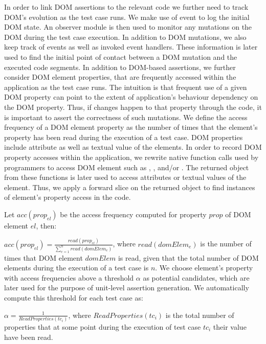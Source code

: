 In order to link DOM assertions to the relevant \javascript code we further need to track DOM's evolution as the test case runs. We make use of  event to log the initial DOM state. An observer module is then used to monitor any mutations on the DOM during the test case execution. In addition to DOM mutations, we also keep track of \javascript events as well as invoked event handlers. These information is later used to find the initial point of contact between a DOM mutation and the executed code segments. 
In addition to DOM-based assertions, we further consider DOM element properties, that are frequently accessed within the application as the test case runs. The intuition is that frequent use of a given DOM property can point to the extent of application's behaviour dependency on the DOM property. Thus, if changes happen to that property through the \javascript code, it is important to assert the correctness of such mutations. We define the access frequency of a DOM element property as the number of times that the element's property has been read during the execution of a test case. DOM properties include attribute as well as textual value of the elements.
In order to record DOM property accesses within the application, we rewrite native function calls used by programmers to access DOM element such as , , and/or . The returned object from these functions is later used to access attributes or textual values of the element. Thus, we apply a forward slice on the returned object to find instances of element's property access in the code.

Let $acc(prop_{el})$ be the access frequency computed for property $prop$ of DOM element $el$, then:
 
$acc(prop_{el})=\frac{read(prop_{el})}{\sum _{e=1}^{n} read(domElem_e)}$, where $read(domElem_{e})$ is the number of times that DOM element $domElem$ is read, given that the total number of DOM elements during the execution of a test case is $n$.
We choose element's property with access frequencies above a threshold $\alpha$ as potential candidates, which are later used for the purpose of unit-level assertion generation. We automatically compute this threshold for each test case as: 

$\alpha=\frac{1}{ReadProperties(tc_i)}$, where $ReadProperties(tc_i)$ is the total number of properties that at some point during the execution of test case $tc_i$ their value have been read.      
